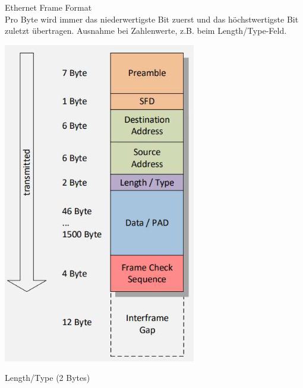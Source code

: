 \begin{definition}{Ethernet Frame Format}\\
    Pro Byte wird immer das niederwertigste Bit zuerst und das höchstwertigste Bit zuletzt übertragen. Ausnahme bei Zahlenwerte, z.B. beim Length/Type-Feld.\\
    \begin{minipage}{0.4\linewidth}
        \includegraphics[width=1\linewidth]{images/ethernet_format.png}
    \end{minipage}
    \begin{minipage}{0.6\linewidth}
    Length/Type (2 Bytes)

\end{minipage}
\end{definition}
